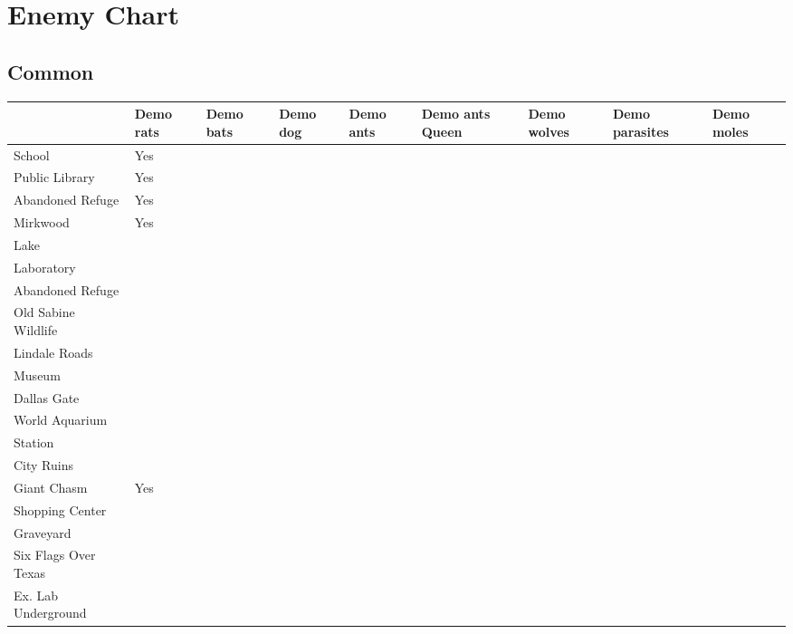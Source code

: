 \section{Enemy Chart}

\vspace*{0.2cm}

\subsection{Common}

\vspace*{0.2cm}

\begin{center}
	\begin{tabular}[c]{| p{2.4cm} | p{1cm} | p{1cm} | p{1cm} | p{1cm} | p{1.7cm} | p{1cm} | p{1.4cm} | p{1cm} | }
		\hline
		& Demo rats & Demo bats & Demo dog & Demo ants & Demo ants Queen & Demo wolves & Demo parasites & Demo moles \\
		\hline
		School & Yes & & & & & & &\\
		\hline
		Public Library & Yes & & & & & & &\\
		\hline
		Abandoned Refuge & Yes & & & & & & & \\
		\hline
		Mirkwood & Yes & & & & & & &\\
		\hline
		Lake & & & & & & & &\\
		\hline
		Laboratory & & & & & & & &\\
		\hline
		Abandoned Refuge & & & & & & & &\\
		\hline
		Old Sabine Wildlife & & & & & & & &\\
		\hline
		Lindale Roads & & & & & & & &\\
		\hline
 		Museum & & & & & & & &\\
		\hline
		Dallas Gate & & & & & & & &\\
		\hline
		World Aquarium & & & & & & & &\\
		\hline
		Station & & & & & & & &\\
		\hline
		City Ruins & & & & & & & &\\
		\hline \rowcolor{light-light-gray}
		Giant Chasm & Yes & & & & & & &\\
		\hline
		Shopping Center & & & & & & & &\\
		\hline
		Graveyard & & & & & & & &\\
		\hline
		Six Flags Over Texas & & & & & & & &\\
		\hline
		Ex. Lab Underground & & & & & & & &\\
		\hline
	\end{tabular}
\end{center}

